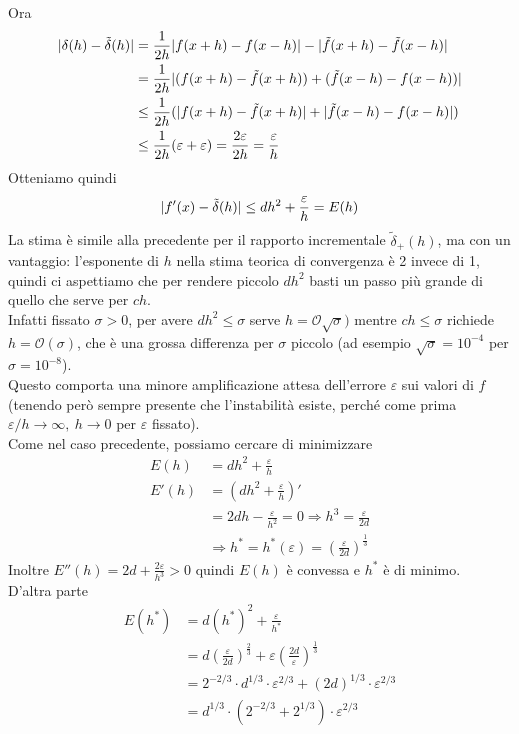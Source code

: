 \documentclass[12pt,a4paper]{article}
\DeclarePairedDelimiter{\abs}{\lvert}{\rvert}
\begin{document}
Ora
\[
\begin{split}
    \abs{\delta(h) - \tilde{\delta}(h)} & = \frac{1}{2h} \abs{f(x+h) - f(x-h)} - \abs{\tilde{f}(x+h) - \tilde{f}(x-h)} \\
    & = \frac{1}{2h} \abs{(f(x+h) - \tilde{f}(x+h)) + (\tilde{f}(x-h) - f(x-h))} \\
    & \le \frac{1}{2h} (\abs{f(x+h) - \tilde{f}(x+h)} + \abs{\tilde{f}(x-h) - f(x-h)}) \\
    & \le \frac{1}{2h} (\varepsilon + \varepsilon) = \frac{2 \varepsilon}{2h} = \frac{\varepsilon}{h}
\end{split}
\]
Otteniamo quindi
\[
\abs{f'(x) - \tilde{\delta}(h)} \le dh^2 + \frac{\varepsilon}{h} = E(h)
\]
La stima è simile alla precedente per il rapporto incrementale $\tilde{\delta}_+ (h)$, ma con un vantaggio: l'esponente di $h$ nella stima teorica di convergenza è 2
invece di 1, quindi ci aspettiamo che per rendere piccolo $dh^2$ basti un passo più grande di quello che serve per $ch$.\\
Infatti fissato $\sigma > 0$, per avere $dh^2 \le \sigma$ serve $h = \mathcal{O}\sqrt{\sigma})$ mentre $ch \le \sigma$ richiede $h = \mathcal{O}(\sigma)$, che è una grossa differenza per $\sigma$ piccolo (ad esempio $\sqrt{\sigma} = 10^{-4}$ per $\sigma = 10^{-8}$).\\
Questo comporta una minore amplificazione attesa dell'errore $\varepsilon$ sui valori di $f$ (tenendo
però sempre presente che l'instabilità esiste, perché come prima $\varepsilon/h \to \infty, \ h \to 0$ per $\varepsilon$ fissato).\\
Come nel caso precedente, possiamo cercare di minimizzare
\[
\begin{split}
E(h) & = dh^2 + \frac{\varepsilon}{h} \\
E'(h) & = (dh^2 + \frac{\varepsilon}{h})' \\
& = 2dh - \frac{\varepsilon}{h^2} = 0 \Rightarrow h^3 = \frac{\varepsilon}{2d} \\
& \Rightarrow h^* = h^* (\varepsilon) = (\frac{\varepsilon}{2d})^{\frac{1}{3}}
\end{split}
\]
Inoltre $E''(h) = 2d + \frac{2\varepsilon}{h^3} > 0$ quindi $E(h)$ è convessa e $h^*$ è di minimo.\\
D'altra parte
\[
\begin{split}
    E(h^*) & = d(h^*)^2 + \frac{\varepsilon}{h^*} \\
    & = d(\frac{\varepsilon}{2d})^{\frac{2}{3}} + \varepsilon(\frac{2d}{\varepsilon})^{\frac{1}{3}} \\
    & = 2^{-2/3} \cdot d^{1/3} \cdot \varepsilon^{2/3} + (2d)^{1/3} \cdot \varepsilon^{2/3} \\
    & = d^{1/3} \cdot (2^{-2/3} + 2^{1/3}) \cdot \varepsilon^{2/3}
\end{split}
\]
\end{document}
